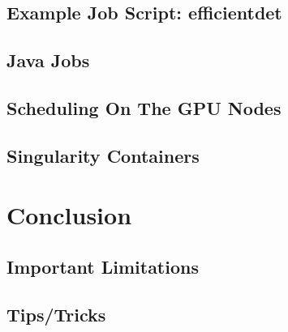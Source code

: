 \documentclass{easychair}
\begin{document}
\subsection{Example Job Script: efficientdet}
\label{sect:example-job-efficientdet}


\subsection{Java Jobs}
\label{sect:java-jobs}


\subsection{Scheduling On The GPU Nodes}
\label{sect:scheduling-gpu-nodes}


\subsection{Singularity Containers}
\label{sect:singularity-containers}


\section{Conclusion}
\label{sect:conclusion}


\subsection{Important Limitations}
\label{sect:limitations}


\subsection{Tips/Tricks}
\label{sect:tips}

\end{document}
